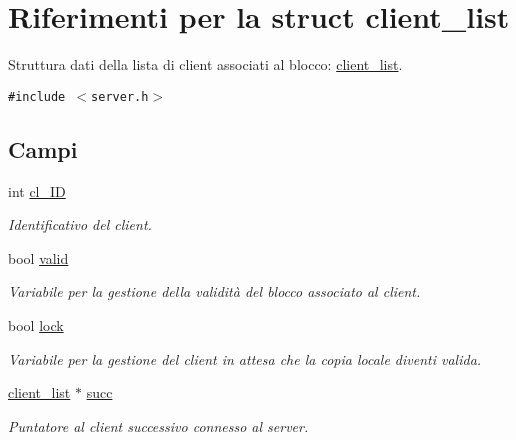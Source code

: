 \hypertarget{structclient__list}{
\section{Riferimenti per la struct client\_\-list}
\label{structclient__list}
}
Struttura dati della lista di client associati al blocco: \hyperlink{structclient__list}{client\_\-list}.  


{\tt \#include $<$server.h$>$}

\subsection*{Campi}
\begin{CompactItemize}
\item 
int \hyperlink{structclient__list_3dd69ca49266d1f26a0324be11a1ce89_3dd69ca49266d1f26a0324be11a1ce89}{cl\_\-ID}
\begin{CompactList}\small\item\em Identificativo del client. \item\end{CompactList}\item 
bool \hyperlink{structclient__list_0472ce71de752ddef8a4cd7410eee065_0472ce71de752ddef8a4cd7410eee065}{valid}
\begin{CompactList}\small\item\em Variabile per la gestione della validità del blocco associato al client. \item\end{CompactList}\item 
bool \hyperlink{structclient__list_7c62f5d8c3576121a64be202bc67b0a2_7c62f5d8c3576121a64be202bc67b0a2}{lock}
\begin{CompactList}\small\item\em Variabile per la gestione del client in attesa che la copia locale diventi valida. \item\end{CompactList}\item 
\hyperlink{structclient__list}{client\_\-list} $\ast$ \hyperlink{structclient__list_b5efb920edea57018e99194c5ae42cff_b5efb920edea57018e99194c5ae42cff}{succ}
\begin{CompactList}\small\item\em Puntatore al client successivo connesso al server. \item\end{CompactList}\end{CompactItemize}


